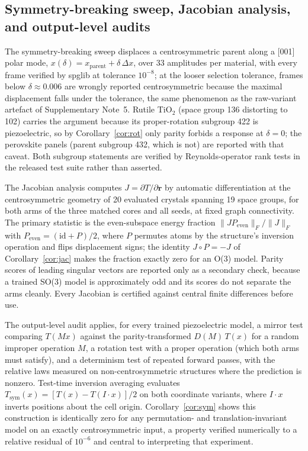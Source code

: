\subsection*{Symmetry-breaking sweep, Jacobian analysis, and output-level audits}

The symmetry-breaking sweep displaces a centrosymmetric parent along a [001] polar mode, $x(\delta) = x_{\mathrm{parent}} + \delta\,\Delta x$, over 33 amplitudes per material, with every frame verified by spglib at tolerance $10^{-8}$; at the looser selection tolerance, frames below $\delta\approx0.006$ are wrongly reported centrosymmetric because the maximal displacement falls under the tolerance, the same phenomenon as the raw-variant artefact of Supplementary Note~5. Rutile TiO$_2$ (space group 136 distorting to 102) carries the argument because its proper-rotation subgroup 422 is piezoelectric, so by Corollary~\ref{cor:rot} only parity forbids a response at $\delta=0$; the perovskite panels (parent subgroup 432, which is not) are reported with that caveat. Both subgroup statements are verified by Reynolds-operator rank tests in the released test suite rather than asserted.

The Jacobian analysis computes $J = \partial T/\partial \mathbf{r}$ by automatic differentiation at the centrosymmetric geometry of 20 evaluated crystals spanning 19 space groups, for both arms of the three matched cores and all seeds, at fixed graph connectivity. The primary statistic is the even-subspace energy fraction $\lVert J P_{\mathrm{even}}\rVert_F / \lVert J \rVert_F$ with $P_{\mathrm{even}} = (\mathrm{id} + P)/2$, where $P$ permutes atoms by the structure's inversion operation and flips displacement signs; the identity $J \circ P = -J$ of Corollary~\ref{cor:jac} makes the fraction exactly zero for an O(3) model. Parity scores of leading singular vectors are reported only as a secondary check, because a trained SO(3) model is approximately odd and its scores do not separate the arms cleanly. Every Jacobian is certified against central finite differences before use.

The output-level audit applies, for every trained piezoelectric model, a mirror test comparing $T(Mx)$ against the parity-transformed $D(M)\,T(x)$ for a random improper operation $M$, a rotation test with a proper operation (which both arms must satisfy), and a determinism test of repeated forward passes, with the relative laws measured on non-centrosymmetric structures where the prediction is nonzero. Test-time inversion averaging evaluates $T_{\mathrm{sym}}(x) = [T(x) - T(I\!\cdot\!x)]/2$ on both coordinate variants, where $I\!\cdot\!x$ inverts positions about the cell origin. Corollary~\ref{cor:sym} shows this construction is identically zero for any permutation- and translation-invariant model on an exactly centrosymmetric input, a property verified numerically to a relative residual of $10^{-6}$ and central to interpreting that experiment.

